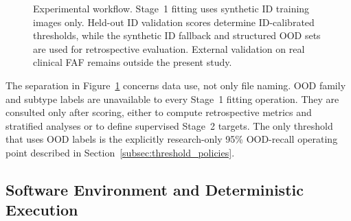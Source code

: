 \documentclass[fleqn,12pt]{olplainarticle}
\begin{document}
\begin{figure}[htbp]
{%
    }

    \caption[Experimental fitting, calibration, and evaluation workflow.]{
    Experimental workflow. Stage~1 fitting uses synthetic ID training
    images only. Held-out ID validation scores determine ID-calibrated
    thresholds, while the synthetic ID fallback and structured OOD sets are
    used for retrospective evaluation. External validation on real clinical
    FAF remains outside the present study.}
    \label{fig:evaluation_paradigm}
\end{figure}

The separation in Figure~\ref{fig:evaluation_paradigm} concerns data use, not
only file naming. OOD family and subtype labels are unavailable to every
Stage~1 fitting operation. They are consulted only after scoring, either to
compute retrospective metrics and stratified analyses or to define supervised
Stage~2 targets. The only threshold that uses OOD labels is the explicitly
research-only 95\% OOD-recall operating point described in
Section~\ref{subsec:threshold_policies}.

\subsection{Software Environment and Deterministic Execution}
\label{subsec:execution_environment}
\end{document}
